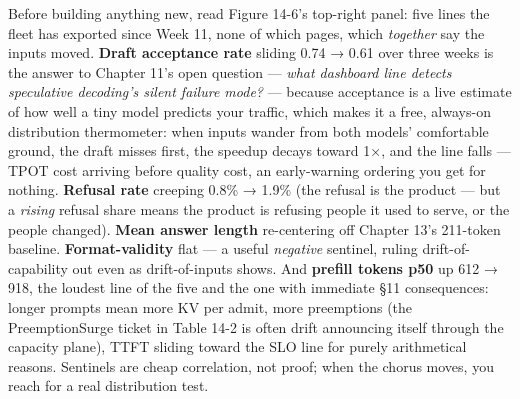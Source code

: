 Before building anything new, read Figure 14-6’s top-right panel: five lines the fleet has exported since Week 11, none of which pages, which \textit{together} say the inputs moved. \textbf{Draft acceptance rate} sliding 0.74 → 0.61 over three weeks is the answer to Chapter 11’s open question — \textit{what dashboard line detects speculative decoding’s silent failure mode?} — because acceptance is a live estimate of how well a tiny model predicts your traffic, which makes it a free, always-on distribution thermometer: when inputs wander from both models’ comfortable ground, the draft misses first, the speedup decays toward 1×, and the line falls — TPOT cost arriving before quality cost, an early-warning ordering you get for nothing. \textbf{Refusal rate} creeping 0.8\% → 1.9\% (the refusal is the product — but a \textit{rising} refusal share means the product is refusing people it used to serve, or the people changed). \textbf{Mean answer length} re-centering off Chapter 13’s 211-token baseline. \textbf{Format-validity} flat — a useful \textit{negative} sentinel, ruling drift-of-capability out even as drift-of-inputs shows. And \textbf{prefill tokens p50} up 612 → 918, the loudest line of the five and the one with immediate §11 consequences: longer prompts mean more KV per admit, more preemptions (the PreemptionSurge ticket in Table 14-2 is often drift announcing itself through the capacity plane), TTFT sliding toward the SLO line for purely arithmetical reasons. Sentinels are cheap correlation, not proof; when the chorus moves, you reach for a real distribution test.

